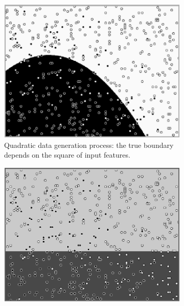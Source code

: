 \begin{figure}[!htb]
{\setlength{\parindent}{0cm}}
\begin{center}
\centering
\begin{subfigure}[t]{0.25\textwidth}
\centering
\includegraphics[width=\textwidth]{figures/chapitre6/lmt_generation.png}
\caption{\label{fig:lmt1} Quadratic data generation process: the true boundary depends on the square of input features.}
\end{subfigure}%
\hspace*{1cm}
\begin{subfigure}[t]{0.25\textwidth}
\centering
\includegraphics[width=\textwidth]{figures/chapitre6/lmt_tree_1.png}

\end{subfigure}
\end{center}
\end{figure}
